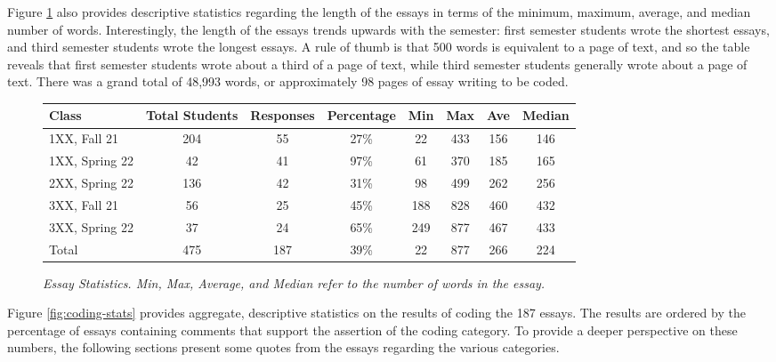 \documentclass[acmsmall]{acmart}
\begin{document}
Figure \ref{fig:essay-stats} also provides descriptive statistics regarding the length of the essays in terms of the minimum, maximum, average, and median number of words. Interestingly, the length of the essays trends upwards with the semester: first semester students wrote the shortest essays, and third semester students wrote the longest essays.  A rule of thumb is that 500 words is equivalent to a page of text, and so the table reveals that first semester students wrote about a third of a page of text, while third semester students generally wrote about a page of text. There was a grand total of 48,993 words, or approximately 98 pages of essay writing to be coded.

\begin{figure}[th]
\centering
\small
\begin{tabular}{ l c c c | c c c c}
\hline
 Class & Total Students & Responses & Percentage & Min & Max & Ave & Median \\
\hline
 1XX, Fall 21 & 204 & 55 & 27\% & 22 & 433 & 156 & 146\\
 1XX, Spring 22 & 42 & 41 & 97\% & 61 & 370 & 185 & 165\\
 2XX, Spring 22 & 136 & 42 & 31\% & 98 & 499 & 262 & 256\\
 3XX, Fall 21 & 56 & 25 & 45\% & 188 & 828 & 460 & 432\\
 3XX, Spring 22 & 37 & 24 & 65\% & 249 & 877 & 467 & 433\\
\hline
Total & 475 & 187 & 39\% & 22 & 877 & 266 & 224\\
\hline
\end{tabular}
\caption{\em Essay Statistics. Min, Max, Average, and Median refer to the number of words in the essay.}
\normalsize
\label{fig:essay-stats}
\end{figure}

Figure \ref{fig:coding-stats} provides aggregate, descriptive statistics on the results of coding the 187 essays. The results are ordered by the percentage of essays containing comments that support the assertion of the coding category. To provide a deeper perspective on these numbers, the following sections present some quotes from the essays regarding the various categories.
\end{document}
